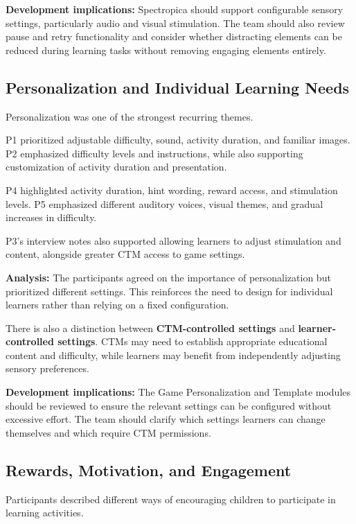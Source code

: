 \documentclass[12pt, titlepage]{article}
\begin{document}
\noindent\textbf{Development implications:} Spectropica should support configurable sensory settings, particularly audio and visual stimulation. The team should also review pause and retry functionality and consider whether distracting elements can be reduced during learning tasks without removing engaging elements entirely.

\subsection{Personalization and Individual Learning Needs}

Personalization was one of the strongest recurring themes.

P1 prioritized adjustable difficulty, sound, activity duration, and familiar images. P2 emphasized difficulty levels and instructions, while also supporting customization of activity duration and presentation.

P4 highlighted activity duration, hint wording, reward access, and stimulation levels. P5 emphasized different auditory voices, visual themes, and gradual increases in difficulty.

P3's interview notes also supported allowing learners to adjust stimulation and content, alongside greater CTM access to game settings.

\noindent\textbf{Analysis:} The participants agreed on the importance of personalization but prioritized different settings. This reinforces the need to design for individual learners rather than relying on a fixed configuration.

There is also a distinction between \textbf{CTM-controlled settings} and \textbf{learner-controlled settings}. CTMs may need to establish appropriate educational content and difficulty, while learners may benefit from independently adjusting sensory preferences.

\noindent\textbf{Development implications:} The Game Personalization and Template modules should be reviewed to ensure the relevant settings can be configured without excessive effort. The team should clarify which settings learners can change themselves and which require CTM permissions.

\subsection{Rewards, Motivation, and Engagement}

Participants described different ways of encouraging children to participate in learning activities.
\end{document}
